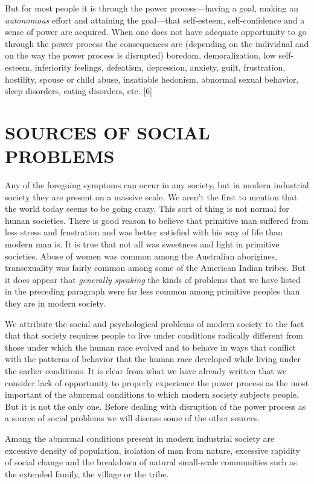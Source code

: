  But for most people it is through the power process—having a goal, making an {\em autonomous} effort and attaining the goal—that self-esteem, self-confidence and a sense of power are acquired. When one does not have adequate opportunity to go through the power process the consequences are (depending on the individual and on the way the power process is disrupted) boredom, demoralization, low self-esteem, inferiority feelings, defeatism, depression, anxiety, guilt, frustration, hostility, spouse or child abuse, insatiable hedonism, abnormal sexual behavior, sleep disorders, eating disorders, etc. [6]

\chapter{SOURCES OF SOCIAL PROBLEMS}

 Any of the foregoing symptoms can occur in any society, but in modern industrial society they are present on a massive scale. We aren’t the first to mention that the world today seems to be going crazy. This sort of thing is not normal for human societies. There is good reason to believe that primitive man suffered from less stress and frustration and was better satisfied with his way of life than modern man is. It is true that not all was sweetness and light in primitive societies. Abuse of women was common among the Australian aborigines, transexuality was fairly common among some of the American Indian tribes. But it does appear that {\em generally speaking} the kinds of problems that we have listed in the preceding paragraph were far less common among primitive peoples than they are in modern society.

 We attribute the social and psychological problems of modern society to the fact that that society requires people to live under conditions radically different from those under which the human race evolved and to behave in ways that conflict with the patterns of behavior that the human race developed while living under the earlier conditions. It is clear from what we have already written that we consider lack of opportunity to properly experience the power process as the most important of the abnormal conditions to which modern society subjects people. But it is not the only one. Before dealing with disruption of the power process as a source of social problems we will discuss some of the other sources.

 Among the abnormal conditions present in modern industrial society are excessive density of population, isolation of man from nature, excessive rapidity of social change and the breakdown of natural small-scale communities such as the extended family, the village or the tribe.

